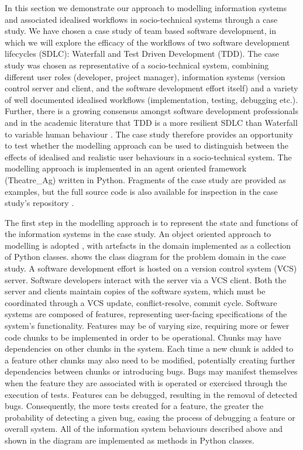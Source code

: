 \documentclass{llncs}
\begin{document}
In this section we demonstrate our approach to modelling information systems and associated idealised workflows in
socio-technical systems through a case study.  We have chosen a case study of team based software development, in which
we will explore the efficacy of the workflows of two software development lifecycles (SDLC): Waterfall and Test Driven
Development (TDD).  The case study was chosen as representative of a socio-technical system, combining different user
roles (developer, project manager), information systems (version control server and client, and the software development
effort itself) and a variety of well documented idealised workflows (implementation, testing, debugging etc.).  Further,
there is a growing consensus amongst software development professionals and in the academic literature that TDD is a
more resilient SDLC than Waterfall to variable human behaviour
\citep{Bhat2006TestDrivenDevelopment,George2004TestDrivenDevelopment,Huang2009EmpiricalTestFirstProgramming}.  The case
study therefore provides an opportunity to test whether the modelling approach can be used to distinguish between the
effects of idealised and realistic user behaviours in a socio-technical system.  The modelling approach is implemented
in an agent oriented framework (Theatre\_Ag) written in Python.  Fragments of the case study are provided as examples,
but the full source code is also available for inspection in the case study's repository
\cite{storer2016softdev-workflow-scm}.

The first step in the modelling approach is to represent the state and functions of the information systems in the case
study. An object oriented approach to modelling is adopted \cite{omg07omguml}, with artefacts in the domain implemented
as a collection of Python classes.   shows the class diagram for the problem domain in the case study.
A software development effort is hosted on a version control system (VCS) server.  Software developers interact with the
server via a VCS client.  Both the server and clients maintain copies of the software system, which must be coordinated
through a VCS update, conflict-resolve, commit cycle.  Software systems are composed of features, representing
user-facing specifications of the system's functionality.  Features may be of varying size, requiring more or fewer code
chunks to be implemented in order to be operational.  Chunks may have dependencies on other chunks in the system.  Each
time a new chunk is added to a feature other chunks may also need to be modified, potentially creating further
dependencies between chunks or introducing bugs.  Bugs may manifest themselves when the feature they are associated with
is operated or exercised through the execution of tests.  Features can be debugged, resulting in the removal of detected
bugs.  Consequently, the more tests created for a feature, the greater the probability of detecting a given bug, easing
the process of debugging a feature or overall system. All of the information system behaviours described above and shown
in the diagram are implemented as methods in Python classes.
\end{document}
